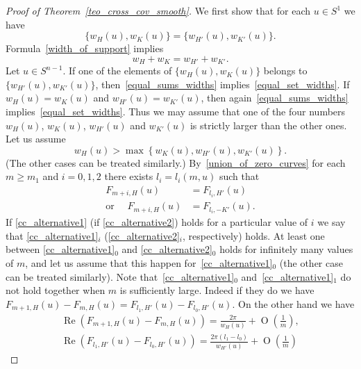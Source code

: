 \documentclass[a4paper]{amsart}
\theoremstyle{definition}
\numberwithin{equation}{section}
\begin{document}
\begin{proof}[Proof of Theorem~\ref{teo_cross_cov_smooth}]
We first show that for each $u\in{S^{1}}$ we have
\begin{equation}\label{equal_set_widths}
 \{{{{w}}}_H(u),{{{w}}}_K(u)\}=\{{{{w}}}_{H'}(u),{{{w}}}_{K'}(u)\}.
\end{equation}
Formula~\eqref{width_of_support} implies
\begin{equation}\label{equal_sums_widths}
 {{{w}}}_H+{{{w}}}_{K}={{{w}}}_{H'}+{{{w}}}_{K'}.
\end{equation}
Let $u\in{S^{n-1}}$. If one of the elements of $\{{{{w}}}_H(u),{{{w}}}_K(u)\}$ belongs to $\{{{{w}}}_{H'}(u),{{{w}}}_{K'}(u)\}$, then~\eqref{equal_sums_widths} implies~\eqref{equal_set_widths}. If ${{{w}}}_H(u)={{{w}}}_K(u)$ and ${{{w}}}_{H'}(u)={{{w}}}_{K'}(u)$, then again~\eqref{equal_sums_widths} implies~\eqref{equal_set_widths}. Thus we may assume that one of the four numbers ${{{w}}}_H(u)$, ${{{w}}}_K(u)$, ${{{w}}}_{H'}(u)$ and ${{{w}}}_{K'}(u)$ is strictly larger than the other ones. Let us assume
\begin{equation}\label{strictly_larger_widths}
 {{{w}}}_H(u)>\max\left\{{{{w}}}_K(u),{{{w}}}_{H'}(u), {{{w}}}_{K'}(u)\right\}.
\end{equation}
(The other cases can be treated similarly.) By~\eqref{union_of_zero_curves} for each $m\geq m_1$ and $i=0,1,2$ there exists $l_i=l_i(m,u)$ such that
\begin{align}
 F_{m+i,H}(u)&=F_{l_i,H'}(u)\label{cc_alternative1}\\
 \text{or }\quad F_{m+i,H}(u)&=F_{l_i,-K'}(u). \label{cc_alternative2}
\end{align}
If \eqref{cc_alternative1} (if \eqref{cc_alternative2}) holds for a particular value of $i$ we say that \eqref{cc_alternative1}$_i$ (\eqref{cc_alternative2}$_i$, respectively) holds. 
At least one between \eqref{cc_alternative1}$_0$ and \eqref{cc_alternative2}$_0$ holds for infinitely many values of $m$, and let us assume that this happen for~\eqref{cc_alternative1}$_0$ (the other case can be treated similarly).
Note that~\eqref{cc_alternative1}$_0$ and~\eqref{cc_alternative1}$_1$ do not hold together when $m$ is sufficiently large. Indeed if they do we have $F_{m+1,H}(u)-F_{m,H}(u)=F_{l_1,H'}(u)-F_{l_0,H'}(u)$. On the other hand we have 
\begin{gather*}
  {\operatorname{Re}}\left(F_{m+1,H}(u)-F_{m,H}(u)\right)=\frac{2\pi}{{{{w}}}_H(u)}+{{\operatorname{O}}}\left(\frac1{m}\right),\\
 {\operatorname{Re}}\left(F_{l_1,H'}(u)-F_{l_0,H'}(u)\right)=\frac{2\pi(l_1-l_0)}{{{{w}}}_{H'}(u)}+{{\operatorname{O}}}\left(\frac1{m}\right)

\end{gather*}
\end{proof}
\end{document}
